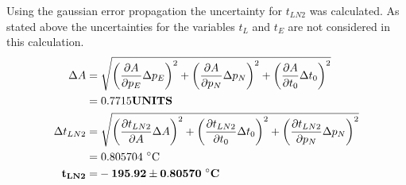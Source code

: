     Using the gaussian error propagation the uncertainty for $t_{LN2}$ was calculated. As stated above
    the uncertainties for the variables $t_L$ and $t_E$ are not considered in this calculation. %
    \begin{align}
        \Delta A =& \; \sqrt{ \left(\frac{\partial A}{\partial p_E} \Delta p_E \right)^2 +
                            \left(\frac{\partial A}{\partial p_N} \Delta p_N \right)^2 +
                            \left(\frac{\partial A}{\partial t_0} \Delta t_0 \right)^2 }\\
        =& \; 0.7715 \textbf{UNITS}\\
        \Delta t_{LN2} =& \; \sqrt{ \left(\frac{\partial t_{LN2}}{\partial A} \Delta A \right)^2 +
                                    \left(\frac{\partial t_{LN2}}{\partial t_0} \Delta t_0 \right)^2 +
                                    \left(\frac{\partial t_{LN2}}{\partial p_N} \Delta p_N \right)^2 }\\
        =& \; 0.805704~\si{\celsius}\\
        \bf t_{LN2} =& \bf -195.92 \pm 0.80570 ~\si{\bf\celsius} \label{res_tN}
    \end{align}






